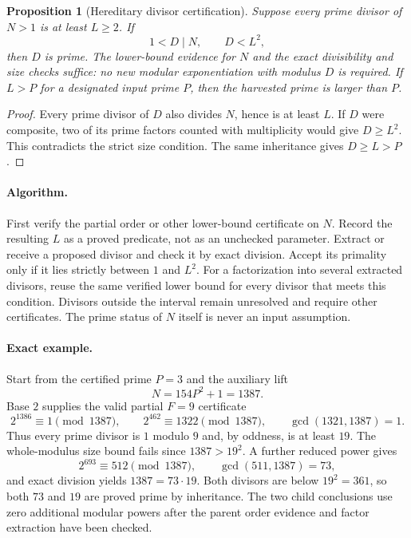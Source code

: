 \documentclass[11pt,a4paper]{article}
\newtheorem{proposition}[theorem]{Proposition}
\theoremstyle{definition}\newtheorem{definition}[theorem]{Definition}
\theoremstyle{remark}\newtheorem{remark}[theorem]{Remark}
\begin{document}
\begin{proposition}[Hereditary divisor certification]\label{prop:cert-inherit}
Suppose every prime divisor of $N>1$ is at least $L\ge2$.  If
\[
 1<D\mid N,\qquad D<L^2,
\]
then $D$ is prime.  The lower-bound evidence for $N$ and the exact
divisibility and size checks suffice: no new modular exponentiation
with modulus $D$ is required.  If $L>P$ for a designated input prime $P$,
then the harvested prime is larger than $P$.
\end{proposition}

\begin{proof}
Every prime divisor of $D$ also divides $N$, hence is at least $L$.
If $D$ were composite, two of its prime factors counted with multiplicity
would give $D\ge L^2$.  This contradicts the strict size condition.
The same inheritance gives $D\ge L>P$.
\end{proof}

\paragraph{Algorithm.}
First verify the partial order or other lower-bound certificate on $N$.
Record the resulting $L$ as a proved predicate, not as an unchecked
parameter.  Extract or receive a proposed divisor and check it by exact
division.  Accept its primality only if it lies strictly between $1$
and $L^2$.  For a factorization into several extracted divisors, reuse the
same verified lower bound for every divisor that meets this condition.
Divisors outside the interval remain unresolved and require other
certificates.  The prime status of $N$ itself is never an input assumption.

\paragraph{Exact example.}
Start from the certified prime $P=3$ and the auxiliary lift
\[
 N=154P^2+1=1387.
\]
Base $2$ supplies the valid partial $F=9$ certificate
\[
 2^{1386}\equiv1\pmod{1387},\qquad
 2^{462}\equiv1322\pmod{1387},\qquad
 \gcd(1321,1387)=1.
\]
Thus every prime divisor is $1$ modulo $9$ and, by oddness, is at least
$19$.  The whole-modulus size bound fails since $1387>19^2$.
A further reduced power gives
\[
 2^{693}\equiv512\pmod{1387},\qquad
 \gcd(511,1387)=73,
\]
and exact division yields $1387=73\cdot19$.  Both divisors are below
$19^2=361$, so both $73$ and $19$ are proved prime by inheritance.  The
two child conclusions use zero additional modular powers after the
parent order evidence and factor extraction have been checked.
\end{document}

